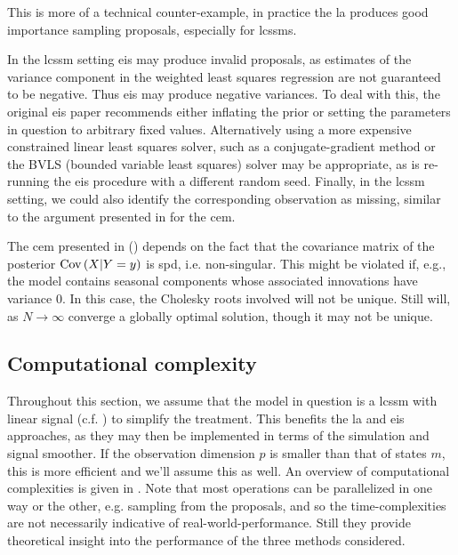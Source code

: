 This is more of a technical counter-example, in practice the \gls{la} produces good importance sampling proposals, especially for \glspl{lcssm}. 

In the \gls{lcssm} setting \gls{eis} may produce invalid proposals, as estimates of the variance component in the weighted least squares regression are not guaranteed to be negative. Thus \gls{eis} may produce negative variances. To deal with this, the original \gls{eis} paper \cite[Section 3.2]{Richard2007Efficient} recommends either inflating the prior or setting the parameters in question to arbitrary fixed values. Alternatively using a more expensive constrained linear least squares solver, such as a conjugate-gradient method \cite{Branch1999Subspace} or the BVLS (bounded variable least squares) solver \cite{Stark1995Boundedvariable} may be appropriate, as is re-running the \gls{eis} procedure with a different random seed. Finally, in the \gls{lcssm} setting, we could also identify the corresponding observation as missing, similar to the argument presented in  for the \gls{cem}. 

The \gls{cem} presented in  () depends on the fact that the covariance matrix of the posterior $\operatorname{Cov} \left( X | Y = y \right)$ is \gls{spd}, i.e. non-singular. This might be violated if, e.g., the model contains seasonal components whose associated innovations have variance $0$. In this case, the Cholesky roots involved will not be unique. Still  will, as $N\to\infty$ converge a globally optimal solution, though it may not be unique. 

\subsection{Computational complexity}
Throughout this section, we assume that the model in question is a \gls{lcssm} with linear signal (c.f. ) to simplify the treatment. This benefits the \gls{la} and \gls{eis} approaches, as they may then be implemented in terms of the simulation and signal smoother. If the observation dimension $p$ is smaller than that of states $m$, this is more efficient and we'll assume this as well.
An overview of computational complexities is given in . Note that most operations can be parallelized in one way or the other, e.g. sampling from the proposals, and so the time-complexities are not necessarily indicative of real-world-performance. Still they provide theoretical insight into the performance of the three methods considered.


